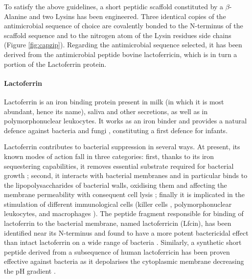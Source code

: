 To satisfy the above guidelines, a short peptidic scaffold constituted by a $\beta$-Alanine and two Lysins has been engineered.
%
Three identical copies of the antimicrobial sequence of choice are covalently bonded to the N-terminus of the scaffold sequence and to the nitrogen atom of the Lysin residues side chains (Figure \ref{fig:capzip}).
%
Regarding the antimicrobial sequence selected, it has been derived from the antimicrobial peptide bovine lactoferricin, which is in turn a portion of the Lactoferrin protein.

\paragraph{Lactoferrin} Lactoferrin is an iron binding protein present in milk (in which it is most abundant, hence its name), saliva and other secretions, as well as in polymorphonuclear leukocytes.
%
It works as an iron binder and provides a natural defence against bacteria and fungi \cite{Sanchez1992,Arnold1977,Arnold1980,Kirkpatrick1971,Jahani2015}, constituting a first defence for infants.

Lactoferrin contributes to bacterial suppression in several ways. At present, its known modes of action fall in three categories: first, thanks to its iron sequestering capabilities, it removes essential substrate required for bacterial growth \cite{Farnaud2003}; second, it interacts with bacterial membranes and in particular binds to the lipopolysaccharides of bacterial walls, oxidising them and affecting the membrane permeability with consequent cell lysis \cite{Farnaud2003}; finally it is implicated in the stimulation of different immunological cells (killer cells \cite{Shau1992}, polymorphonuclear leukocytes, and macrophages \cite{Gahr1991}).
The peptide fragment responsible for binding of lactoferrin to the bacterial membrane, named lactoferricin (Lfcin), has been identified near its N-terminus and found to have a more potent bactericidal effect than intact lactoferrin on a wide range of bacteria \cite{Gifford2005,Bellamy1992,Tomita1994,Wakabayashi1996}.
%
Similarly, a synthetic short peptide derived from a subsequence of human lactoferricin has been proven effective against bacteria as it depolarises the cytoplasmic membrane decreasing the pH gradient \cite{Aguilera1999}.


